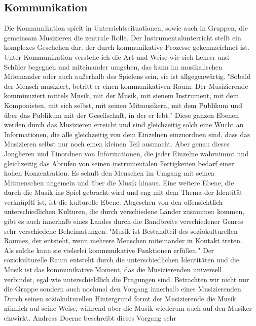 \subsection{Kommunikation}
Die Kommunikation spielt in Unterrichtssituationen, sowie auch in Gruppen, die
gemeinsam Musizieren die zentrale Rolle. Der Instrumentalunterricht stellt ein komplexes Geschehen dar, der
durch
kommunikative Prozesse gekennzeichnet ist. %
Unter Kommunikation verstehe ich die Art und Weise wie sich Lehrer und Schüler
begegnen und miteinander umgehen, das kann im musikalischen Miteinander oder
auch außerhalb des Spielens sein, sie ist allgegenwärtig. 
"Sobald der Mensch musiziert, betritt er einen kommunikativen Raum. Der
Musizierende komminuziert mittels Musik, mit der Musik, mit sienem Instrument,
mit dem Komponisten, mit sich selbst, mit seinen Mitmusikern, mit dem Publikum
und über das Publikum mit der Gesellschaft, in der er lebt." \autocite[56]{doerne:umfassend_musizieren}
Diese ganzen Ebenen werden durch das Musizieren erreicht und sind gleichzeitig
solch eine Wucht an Informationen, die alle gleichzeitig von dem Einzelnen
einzuordnen sind, dass das Musizieren selbst nur noch einen kleinen Teil
ausmacht. Aber genau dieses Jonglieren und Einordnen von Informationen, die
jeder Einzelne wahrnimmt und gleichzeitig das Abrufen von seinen instrumentalen
Fertigkeiten bedarf einer hohen Konzentration. Es schult den Menschen im Umgang
mit seinen Mitmenschen ungemein und über die Musik hinaus. Eine weitere Ebene,
die durch die Musik ins Spiel gebracht wird und eng mit dem Thema der
Identität verknüpftf ist, ist die kulturelle Ebene. Abgesehen von den
offensichtlich unterschiedlichen Kulturen, die durch verschiedene Länder
zusammen kommen, gibt es auch innerhalb eines Landes durch die Bandbreite
verschiedener Genres sehr verschiedene Beheimatungen. 
"Musik ist Bestandteil des soziokulturellen Raumes, der entsteht, wenn mehrere
Menschen miteinander in Kontakt treten. Als solche kann sie vielerlei
kommunikative Funktionen erfüllen." \autocite[56]{doerne:umfassend_musizieren} Der soziokulturelle
Raum entsteht durch die unterschiedlichen Identitäten und die Musik ist das
kommunikative Moment, das die Musizierenden universell verbindet, egal wie
unterschieldlich die Prägungen sind. Betrachten wir nicht nur die Gruppe sondern
auch nochmal den Vorgang innerhalb eines Musizierenden. Durch seinen soziokulturellen Hintergrund
formt der Musizierende die Musik nämlich auf seine Weise, während aber die Musik
wiederum auch auf den Musiker einwirkt. Andreas Doerne beschreibt dieses Vorgang sehr
